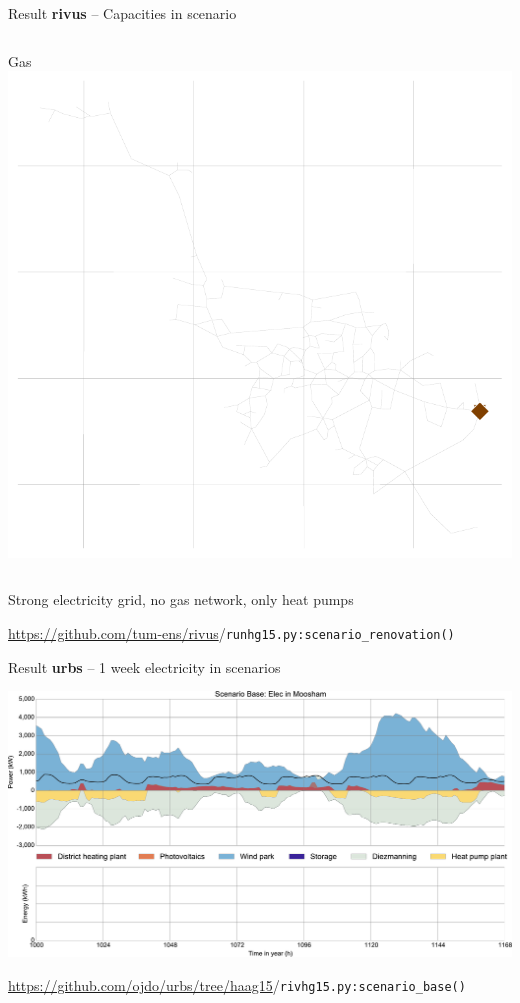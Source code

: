 \begin{frame}{Result \textbf{rivus} -- Capacities in scenario }
\begin{columns}
        \column{\squeezethree}
        	\centering
        	\textcolor{gas}{Gas} \vphantom{gÖ}
        	\includegraphics[width=\squeezethree]{img/haag/scenario_renovation-caps-Gas}
    \end{columns}

    \begin{center}
        Strong electricity grid, no gas network, only heat pumps
    \end{center}

    {\tiny \url{https://github.com/tum-ens/rivus}/\texttt{runhg15.py:scenario\_renovation()}}
\end{frame}

\begin{frame}{Result \textbf{urbs} -- 1 week electricity in scenarios }
    \begin{center}
        \includegraphics[width=.95\textwidth]{img/haag/scenario_base-Elec-Moosham-spr_edit}
    \end{center}
    \vspace{-1em}
    {\tiny \url{https://github.com/ojdo/urbs/tree/haag15}/\texttt{rivhg15.py:scenario\_base()}}
\end{frame}

